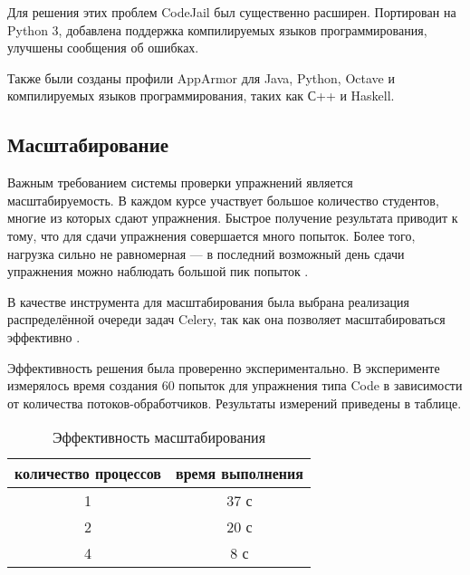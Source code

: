 \documentclass{matmex-diploma-custom}
\begin{document}
Для решения этих проблем CodeJail был существенно
расширен. Портирован на Python 3, добавлена поддержка компилируемых
языков программирования, улучшены сообщения об ошибках.

Также были созданы профили AppArmor для Java, Python, Octave и
компилируемых языков программирования, таких как С++ и Haskell.

\subsection{Масштабирование}
Важным требованием системы проверки упражнений является
масштабируемость. В каждом курсе участвует большое количество
студентов, многие из которых сдают упражнения. Быстрое получение
результата приводит к тому, что для сдачи упражнения совершается много
попыток. Более того, нагрузка сильно не равномерная --- в последний
возможный день сдачи упражнения можно наблюдать большой пик
попыток \cite{breslow2013studying}.

В качестве инструмента для масштабирования была выбрана реализация
распределённой очереди задач Celery, так как она позволяет
масштабироваться эффективно \cite{celery}.

Эффективность решения была проверенно экспериментально. В эксперименте
измерялось время создания 60 попыток для упражнения типа Code в
зависимости от количества потоков-обработчиков. Результаты измерений
приведены в таблице.

\begin{table}[t]
  \centering
\begin{tabular}{|c|c|}
\hline
количество процессов & время выполнения \\
\hline
1 & 37 с \\
2 & 20 с \\
4 & 8 с \\
\hline
\end{tabular}
  \caption{Эффективность масштабирования}
  \label{table:scal}
\end{table}

\iffalse
#+ORGTBL: SEND scal orgtbl-to-latex :splice nil :skip 0
|----------------------+------------------|
| количество процессов | время выполнения |
|----------------------+------------------|
|                    1 | 37 с             |
|                    2 | 20 с             |
|                    4 | 8 с              |
|----------------------+------------------|
\fi


\end{document}
